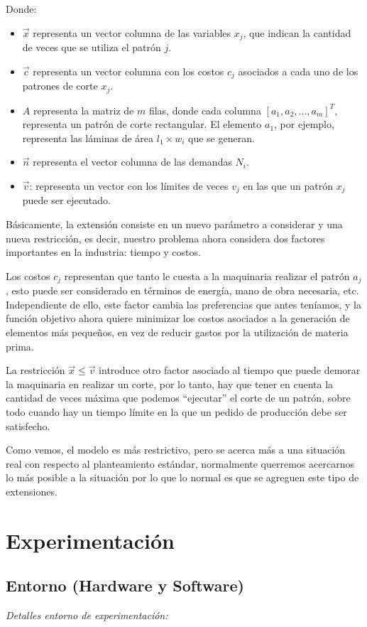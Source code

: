 \documentclass[journal, 10pt]{IEEEtran}
\begin{document}
	Donde:
	\begin{itemize}
		\item
			$\vec{x}$ representa un vector columna de las variables $x_j$, que
			indican la cantidad de veces que se utiliza el patrón $j$.
		\item
			$\vec{c}$ representa un vector columna con los costos $c_j$
			asociados a cada uno de los patrones de corte $x_j$.
		\item 
			$A$ representa la matriz de $m$ filas, donde cada columna 
			$[a_1,a_2,...,a_m]^T$, representa un patrón de corte rectangular. 
			El elemento $a_1$, por ejemplo, representa las láminas de 
			área $l_1 \times w_i$ que se generan.
		\item
			$\vec{n}$ representa el vector columna de las demandas $N_i$.
		\item
			$\vec{v}$: representa un vector con los límites de veces  $v_j$ en
			las que un patrón $x_j$ puede ser ejecutado.
	\end{itemize}
	Básicamente, la extensión consiste en un nuevo parámetro a considerar y una
	nueva restricción, es decir, nuestro problema ahora considera dos factores
	importantes en la industria: tiempo y costos. 
	
	Los costos $c_j$ representan que tanto le cuesta a la maquinaria realizar el
	patrón $a_j$, esto puede ser considerado en términos de energía, mano de
	obra necesaria, etc. Independiente de ello, este factor cambia las
	preferencias que antes teníamos, y la función objetivo ahora quiere
	minimizar los costos asociados a la generación de elementos más pequeños, en
	vez de reducir gastos por la utilización de materia prima.
	
	La restricción $\vec{x} \leq \vec{v}$ introduce otro factor asociado al
	tiempo que puede demorar la maquinaria en realizar un corte, por lo tanto,
	hay que tener en cuenta la cantidad de veces máxima que podemos ``ejecutar''
	el corte de un patrón, sobre todo cuando hay un tiempo límite en la que un
	pedido de producción debe ser satisfecho.
	
	Como vemos, el modelo es más restrictivo, pero se acerca más a una situación
	real con respecto al planteamiento estándar, normalmente querremos
	acercarnos lo más posible a la situación por lo que lo normal es que se
	agreguen este tipo de extensiones.
\section{Experimentación}
	\subsection{Entorno (Hardware y Software)}
		\emph{Detalles entorno de experimentación:}
		
\end{document}
